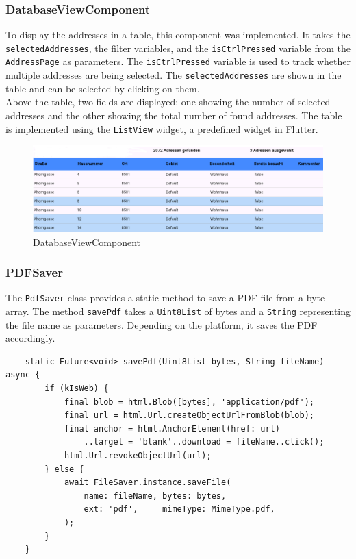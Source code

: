 \subsubsection{DatabaseViewComponent}
\label{fig:DatabaseViewComponent}
To display the addresses in a table, this component was implemented. It takes the \texttt{selectedAddresses}, the filter variables, and the \texttt{isCtrlPressed} variable from the \texttt{AddressPage} as parameters. The \texttt{isCtrlPressed} variable is used to track whether multiple addresses are being selected. The \texttt{selectedAddresses} are shown in the table and can be selected by clicking on them.\\

Above the table, two fields are displayed: one showing the number of selected addresses and the other showing the total number of found addresses. The table is implemented using the \texttt{ListView} widget, a predefined widget in Flutter.


\begin{figure}[H]
    \centering
    \includegraphics[width=0.9\linewidth]{images/AdminPanel/DataBaseViewComponent.png}
    \caption{DatabaseViewComponent}
\end{figure}


\subsubsection{PDFSaver}
The \texttt{PdfSaver} class provides a static method to save a PDF file from a byte array. The method \texttt{savePdf} takes a \texttt{Uint8List} of bytes and a \texttt{String} representing the file name as parameters. Depending on the platform, it saves the PDF accordingly.


\lstset{style=mycsharp, caption=savePdf method in PDFSaver}
\begin{lstlisting}
    static Future<void> savePdf(Uint8List bytes, String fileName) async {
        if (kIsWeb) {
            final blob = html.Blob([bytes], 'application/pdf');
            final url = html.Url.createObjectUrlFromBlob(blob);
            final anchor = html.AnchorElement(href: url)
                ..target = 'blank'..download = fileName..click();
            html.Url.revokeObjectUrl(url);
        } else {
            await FileSaver.instance.saveFile(
                name: fileName, bytes: bytes,
                ext: 'pdf',     mimeType: MimeType.pdf,
            );
        }
    }
    
\end{lstlisting}

